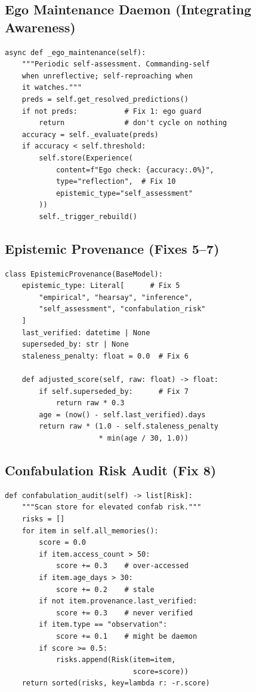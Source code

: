 \documentclass[10pt,twocolumn,a4paper]{article}
\begin{document}
\subsection*{Ego Maintenance Daemon (Integrating Awareness)}

\begin{verbatim}
async def _ego_maintenance(self):
    """Periodic self-assessment. Commanding-self
    when unreflective; self-reproaching when
    it watches."""
    preds = self.get_resolved_predictions()
    if not preds:           # Fix 1: ego guard
        return              # don't cycle on nothing
    accuracy = self._evaluate(preds)
    if accuracy < self.threshold:
        self.store(Experience(
            content=f"Ego check: {accuracy:.0%}",
            type="reflection",  # Fix 10
            epistemic_type="self_assessment"
        ))
        self._trigger_rebuild()
\end{verbatim}

\subsection*{Epistemic Provenance (Fixes 5--7)}

\begin{verbatim}
class EpistemicProvenance(BaseModel):
    epistemic_type: Literal[      # Fix 5
        "empirical", "hearsay", "inference",
        "self_assessment", "confabulation_risk"
    ]
    last_verified: datetime | None
    superseded_by: str | None
    staleness_penalty: float = 0.0  # Fix 6

    def adjusted_score(self, raw: float) -> float:
        if self.superseded_by:      # Fix 7
            return raw * 0.3
        age = (now() - self.last_verified).days
        return raw * (1.0 - self.staleness_penalty
                      * min(age / 30, 1.0))
\end{verbatim}

\subsection*{Confabulation Risk Audit (Fix 8)}

\begin{verbatim}
def confabulation_audit(self) -> list[Risk]:
    """Scan store for elevated confab risk."""
    risks = []
    for item in self.all_memories():
        score = 0.0
        if item.access_count > 50:
            score += 0.3    # over-accessed
        if item.age_days > 30:
            score += 0.2    # stale
        if not item.provenance.last_verified:
            score += 0.3    # never verified
        if item.type == "observation":
            score += 0.1    # might be daemon
        if score >= 0.5:
            risks.append(Risk(item=item,
                              score=score))
    return sorted(risks, key=lambda r: -r.score)
\end{verbatim}
\end{document}
